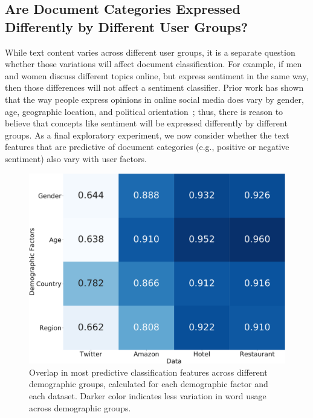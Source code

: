 \subsection{Are Document Categories Expressed Differently by Different User Groups?}

While text content varies across different user groups,
it is a separate question whether those variations will affect document classification.
For example, if men and women discuss different topics online,
but express sentiment in the same way,
then those differences will not affect a sentiment classifier.
Prior work has shown that the way 
people express opinions in online social media 
does vary by gender, age, geographic location, and political orientation~\cite{hinds2018demographic};
thus, there is reason to believe that concepts like sentiment will be expressed differently by different groups.
As a final exploratory experiment,
we now consider whether the text features that are predictive of
document categories (e.g., positive or negative sentiment)
also vary with user factors.

\begin{figure}[tb!]
\centering
\includegraphics[scale=0.30]{./images/chapter4/overlap.pdf}
\caption{Overlap in most predictive classification features across different demographic groups, calculated for each demographic factor and each dataset. Darker color indicates less variation in word usage across demographic groups.
}
\label{fig:overlap}
\end{figure}

